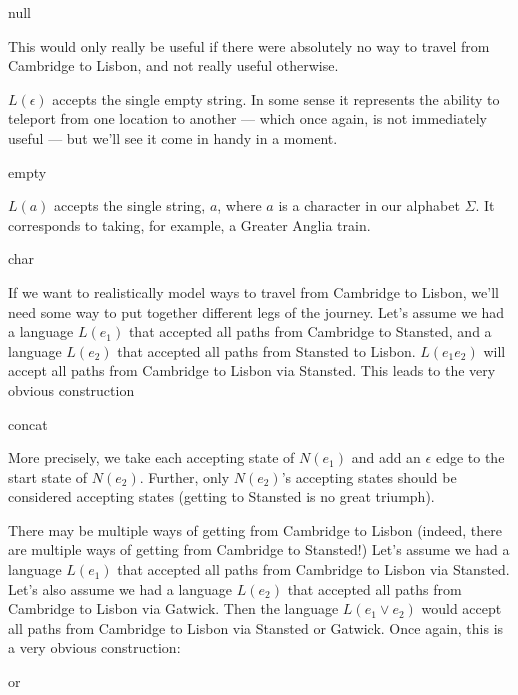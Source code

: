 \begin{center}
{null}
\end{center}

This would only really be useful if there were absolutely no way to travel from Cambridge to Lisbon, and not really useful otherwise.

$L(\epsilon)$ accepts the single empty string. In some sense it represents the ability to teleport from one location to another --- which once again, is not immediately useful --- but we'll see it come in handy in a moment.

\begin{center}
{empty}
\end{center}

$L(a)$ accepts the single string, $a$, where $a$ is a character in our alphabet $\Sigma$. It corresponds to taking, for example, a Greater Anglia train.

\begin{center}
{char}
\end{center}

If we want to realistically model ways to travel from Cambridge to Lisbon, we'll need some way to put together different legs of the journey. Let's assume we had a language $L(e_1)$ that accepted all paths from Cambridge to Stansted, and a language $L(e_2)$ that accepted all paths from Stansted to Lisbon. $L(e_1 e_2)$ will accept all paths from Cambridge to Lisbon via Stansted. This leads to the very obvious construction

\begin{center}
    {concat}
\end{center}

More precisely, we take each accepting state of $N(e_1)$ and add an $\epsilon$ edge to the start state of $N(e_2)$. Further, only $N(e_2)$'s accepting states should be considered accepting states (getting to Stansted is no great triumph).  

There may be multiple ways of getting from Cambridge to Lisbon (indeed, there are multiple ways of getting from Cambridge to Stansted!) Let's assume we had a language $L(e_1)$ that accepted all paths from Cambridge to Lisbon via Stansted. Let's also assume we had a language $L(e_2)$ that accepted all paths from Cambridge to Lisbon via Gatwick. Then the language $L(e_1 \lor e_2)$ would accept all paths from Cambridge to Lisbon via Stansted or Gatwick. Once again, this is a very obvious construction:
\begin{center}
{or}
\end{center}


